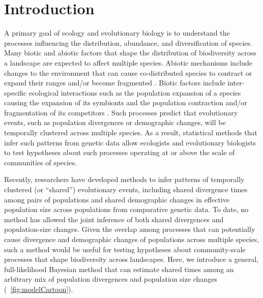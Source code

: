 \section{Introduction}

A primary goal of ecology and evolutionary biology is to understand the
processes influencing the distribution, abundance, and diversification of
species.
Many biotic and abiotic factors that shape the distribution of biodiversity
across a landscape are expected to affect multiple species.
Abiotic mechanisms include changes to the environment that can cause
co-distributed species to contract or expand their ranges and/or become
fragmented \citep{Wegener1966,Avise1987,Knowles2002}.
Biotic factors include inter-specific ecological interactions such as the
population expansion of a species causing the expansion of its symbionts and
the population contraction and/or fragmentation of its competitors
\citep{Lotka1920,Volterra1926}.
Such processes predict that evolutionary events, such as population divergences
or demographic changes, will be temporally clustered across multiple species.
As a result, statistical methods that infer such patterns from genetic data
allow ecologists and evolutionary biologists to test hypotheses about such
processes operating at or above the scale of communities of species.

Recently, researchers have developed methods to infer
patterns of temporally clustered (or ``shared'') evolutionary events,
including shared divergence times among pairs of populations
\citep{Hickerson2006,Hickerson2007,Huang2011,Oaks2014dpp,Oaks2018ecoevolity}
and shared demographic changes in effective population size across populations
\citep{Chan2014,Xue2015,Burbrink2016,Prates2016,Xue2017,Gehara2017}
from comparative genetic data.
To date, no method has allowed the joint inference of both shared divergences
and population-size changes.
Given the overlap among processes that can potentially cause divergence and
demographic changes of populations across multiple species, such a method would
be useful for testing hypotheses about community-scale processes that shape
biodiversity across landscapes.
Here, we introduce a general, full-likelihood Bayesian method that can estimate
shared times among an arbitrary mix of population divergences and population
size changes (\fig{}~\ref{fig:modelCartoon}).

